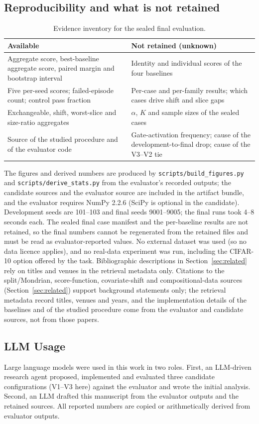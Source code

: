 \documentclass{article}
\begin{document}
\subsection{Reproducibility and what is not retained}

\begin{table}[htbp]
\centering
\caption{Evidence inventory for the sealed final evaluation.}
\label{tab:inventory}
\begin{tabular}{p{}p{}}
\toprule
Available & Not retained (unknown) \\
\midrule
Aggregate score, best-baseline aggregate score, paired margin and bootstrap interval & Identity and individual scores of the four baselines \\
Five per-seed scores; failed-episode count; control pass fraction & Per-case and per-family results; which cases drive shift and slice gaps \\
Exchangeable, shift, worst-slice and size-ratio aggregates & $\alpha$, $K$ and sample sizes of the sealed cases \\
Source of the studied procedure and of the evaluator code & Gate-activation frequency; cause of the development-to-final drop; cause of the V3--V2 tie \\
\bottomrule
\end{tabular}
\end{table}

The figures and derived numbers are produced by \texttt{scripts/build\_figures.py} and \texttt{scripts/derive\_stats.py} from the evaluator's recorded outputs; the candidate sources and the evaluator source are included in the artifact bundle, and the evaluator requires NumPy 2.2.6 (SciPy is optional in the candidate). Development seeds are 101--103 and final seeds 9001--9005; the final runs took 4--8 seconds each. The sealed final case manifest and the per-baseline results are not retained, so the final numbers cannot be regenerated from the retained files and must be read as evaluator-reported values. No external dataset was used (so no data licence applies), and no real-data experiment was run, including the CIFAR-10 option offered by the task. Bibliographic descriptions in Section~\ref{sec:related} rely on titles and venues in the retrieval metadata only. Citations to the split/Mondrian, score-function, covariate-shift and compositional-data sources (Section~\ref{sec:related}) support background statements only; the retrieval metadata record titles, venues and years, and the implementation details of the baselines and of the studied procedure come from the evaluator and candidate sources, not from those papers.

\subsection{LLM Usage}
Large language models were used in this work in two roles. First, an LLM-driven research agent proposed, implemented and evaluated three candidate configurations (V1--V3 here) against the evaluator and wrote the initial analysis. Second, an LLM drafted this manuscript from the evaluator outputs and the retained sources. All reported numbers are copied or arithmetically derived from evaluator outputs.
\end{document}
